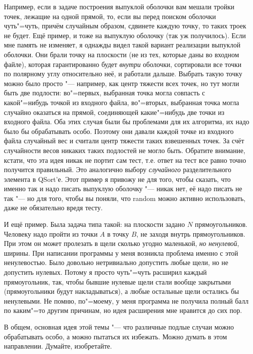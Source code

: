 Например, если в задаче построения выпуклой оболочки вам мешали тройки точек, лежащие на 
одной прямой, то, если вы перед поиском оболочки чуть"=чуть, причём случайным образом, сдвинете 
каждую точку, то таких троек не будет. 
Ещё пример, и тоже на выпуклую оболочку (так уж получилось). Если мне память не изменяет, я однажды видел такой вариант реализации выпуклой 
оболочки. Они брали точку на плоскости (не из 
тех, которые даны во входном файле), которая 
гарантированно будет \textit{внутри} оболочки, сортировали все точки по полярному углу относительно 
неё, и работали дальше. Выбрать такую точку можно было просто "--- например, как центр тяжести всех точек, но тут 
могли быть две подлости: во"=первых, выбранная точка могла совпасть с 
какой"=нибудь точкой из входного файла, во"=вторых, выбранная точка могла случайно оказаться на 
прямой, соединяющей какие"=нибудь две точки из входного файла. Оба этих случая были бы проблемами 
для их алгоритма, их надо было бы обрабатывать особо. Поэтому они давали каждой точке из 
входного файла случайный вес и считали центр тяжести таких взвешенных точек. За счёт случайности
весов никаких таких подлостей не могло быть. Обратите внимание, кстати, что эта идея никак не 
портит сам тест, т.е. ответ на тест все равно точно получится правильный. Это аналогично выбору 
\textit{случайного} разделительного элемента в QSort'е. Этот пример я привожу не для того, чтобы 
сказать, что именно так и надо писать выпуклую оболочку "--- никак нет, её надо писать не так "--- но для того, чтобы вы поняли, что random можно активно использовать, 
даже не обязательно вредя тесту.

И ещё пример. Была задача типа такой: на плоскости задано $N$ прямоугольников. Человеку надо пройти 
из точки $A$ в точку $B$, не заходя внутрь прямоугольников. При этом он может пролезать в щели 
сколько угодно маленькой, \textit{но ненулевой}, ширины. При написании программы у меня возникла 
проблема именно с этой ненулевостью. Было довольно нетривиально допустить любые щели, но не 
допустить нулевых. Потому я просто чуть"=чуть расширил каждый прямоугольник, так, чтобы бывшие нулевые щели 
стали вообще закрытыми (прямоугольники будут накладываться), а любые остальные щели остались бы 
ненулевыми. Не помню, по"=моему, у меня программа не получила полный балл по каким"=то другим 
причинам, но идея расширения мне нравится до сих пор.

В общем, основная идея этой темы "--- что различные подлые случаи можно обрабатывать особо, а можно 
пытаться их избежать. Можно думать в этом направлении. Думайте, изобретайте.